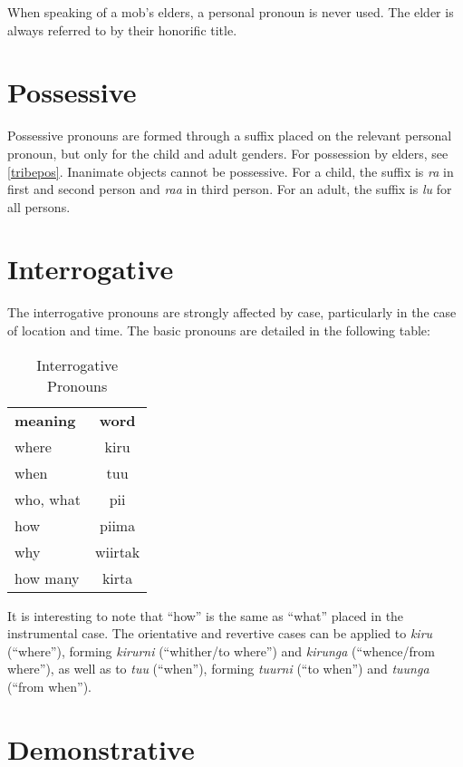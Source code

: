 When speaking of a mob's elders, a personal pronoun is never used. The elder is
always referred to by their honorific title.

\section{Possessive}

Possessive pronouns are formed through a suffix placed on the relevant personal
pronoun, but only for the child and adult genders. For possession by elders, see
\ref{tribepos}. Inanimate objects cannot be possessive. For a child, the suffix
is \textit{ra} in first and second person and \textit{raa} in third person. For
an adult, the suffix is \textit{lu} for all persons.

\section{Interrogative}

The interrogative pronouns are strongly affected by case, particularly in the
case of location and time. The basic pronouns are detailed in the following
table:

\begin{table}[h]
\centering
\begin{tabular}{lc}
 \textbf{meaning} & \textbf{word}\\
 where & kiru\\
 when & tuu\\
 who, what & pii\\
 how & piima\\
 why & wiirtak\\
 how many & kirta\\
\end{tabular}
\caption{Interrogative Pronouns}
\end{table}

It is interesting to note that ``how'' is the same as ``what'' placed in the
instrumental case. The orientative and revertive cases can be applied to
\textit{kiru} (``where''), forming \textit{kirurni} (``whither/to where'') and
\textit{kirunga} (``whence/from where''), as well as to \textit{tuu} (``when''),
forming \textit{tuurni} (``to when'') and \textit{tuunga} (``from when'').

\section{Demonstrative}

